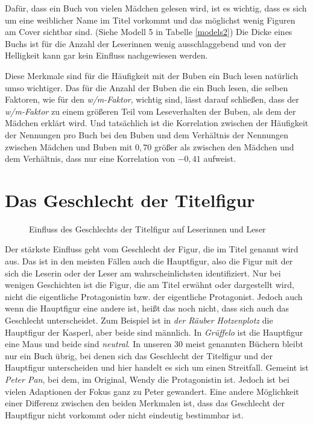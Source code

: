 Dafür, dass ein Buch von vielen Mädchen gelesen wird, ist es wichtig,
dass es sich um eine weiblicher Name im Titel vorkommt und das möglichst
wenig Figuren am Cover sichtbar sind. (Siehe Modell 5 in Tabelle
\ref{models2}) Die Dicke eines Buchs ist für die Anzahl der Leserinnen
wenig ausschlaggebend und von der Helligkeit kann gar kein Einfluss
nachgewiesen werden.

Diese Merkmale sind für die Häufigkeit mit der Buben ein Buch lesen
natürlich umso wichtiger. Das für die Anzahl der Buben die ein Buch
lesen, die selben Faktoren, wie für den \emph{w/m-Faktor}, wichtig sind,
lässt darauf schließen, dass der \emph{w/m-Faktor} zu einem größeren
Teil vom Leseverhalten der Buben, als dem der Mädchen erklärt wird. Und
tatsächlich ist die Korrelation zwischen der Häufigkeit der Nennungen
pro Buch bei den Buben und dem Verhältnis der Nennungen zwischen Mädchen
und Buben mit $0{,}70$ größer als zwischen den Mädchen und dem
Verhältnis, dass nur eine Korrelation von $-0{,}41$ aufweist.

\section{Das Geschlecht der Titelfigur}

\begin{figure}
\center
  \label{titelfig}
  \small

  \caption[Einfluss des Geschlechts der Titelfigur]{Einfluss des Geschlechts der Titelfigur auf Leserinnen und Leser}
\end{figure}

Der stärkste Einfluss geht vom Geschlecht der Figur, die im Titel
genannt wird aus. Das ist in den meisten Fällen auch die Hauptfigur,
also die Figur mit der sich die Leserin oder der Leser am
wahrscheinlichsten identifiziert. Nur bei wenigen Geschichten ist die
Figur, die am Titel erwähnt oder dargestellt wird, nicht die eigentliche
Protagonistin bzw. der eigentliche Protagonist. Jedoch auch wenn die
Hauptfigur eine andere ist, heißt das noch nicht, dass sich auch das
Geschlecht unterscheidet. Zum Beispiel ist in \emph{der Räuber
Hotzenplotz} die Hauptfigur der Kasperl, aber beide sind männlich. In
\emph{Grüffelo} ist die Hauptfigur eine Maus und beide sind
\emph{neutral}. In unseren 30 meist genannten Büchern bleibt nur ein
Buch übrig, bei denen sich das Geschlecht der Titelfigur und der
Hauptfigur unterscheiden und hier handelt es sich um einen Streitfall.
Gemeint ist \emph{Peter Pan}, bei dem, im Original, Wendy die
Protagonistin ist. Jedoch ist bei vielen Adaptionen der Fokus ganz zu
Peter gewandert. Eine andere Möglichkeit einer Differenz zwischen den
beiden Merkmalen ist, dass das Geschlecht der Hauptfigur nicht vorkommt
oder nicht eindeutig bestimmbar ist.

